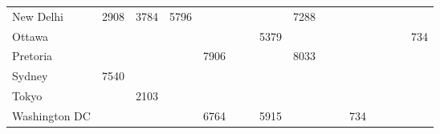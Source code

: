 \begin{tabular}{l|lllllllllllllll}
New Delhi     & 2908    & 3784    & 5796   &          &               &      &        & 7288   &        &           &        &          &        &       &               \\[4pt]
Ottawa        &         &         &        &          &               &      & 5379   &        &        &           &        &          &        &       & 734           \\[4pt]
Pretoria      &         &         &        & 7906     &               &      &        & 8033   &        &           &        &          &        &       &               \\[4pt]
Sydney        & 7540    &         &        &          &               &      &        &        &        &           &        &          &        &       &               \\[4pt]
Tokyo         &         & 2103    &        &          &               &      &        &        &        &           &        &          &        &       &               \\[4pt]
Washington DC &         &         &        & 6764     &               &      & 5915   &        &        &           & 734    &          &        &       &               \\\hline
\end{tabular}
